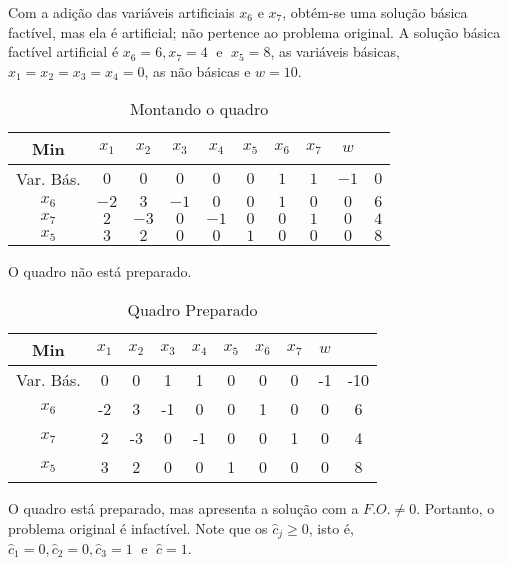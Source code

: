 Com a adição das variáveis artificiais $ x_6 $ e $ x_7 $, obtém-se uma solução
básica factível, mas ela é artificial; não pertence ao problema original.
A solução básica factível artificial é $ x_6 = 6, x_7 = 4 \;\text{ e }\; x_5 = 8 $,
as variáveis básicas, $ x_1 = x_2 = x_3 = x_4 = 0 $, as não básicas e $ w = 10 $.

\newpage

\begin{table}[!htbp]
  \centering
  \caption{Montando o quadro}
  \begin{tabular}{c|cccccccc|c}
    Min       & $x_1$ & $x_2$ & $x_3$ & $x_4$ & $x_5$ & $x_6$ & $x_7$ & $w$ &  \\
    \hline
    Var. Bás. & $0$     & $0$     & $0$     & $0$     & $0$     & $1$     & $1$     & $-1$  & $0$  \\
    \hline
    $x_6$     & $-2$    &  $3$    & $-1$    &  $0$    & $0$     & $1$     & $0$     & $0$   & $6$ \\ 
    $x_7$     &  $2$    & $-3$    &  $0$    & $-1$    & $0$     & $0$     & $1$     & $0$   & $4$ \\
    $x_5$     &  $3$    &  $2$    &  $0$    &  $0$    & $1$     & $0$     & $0$     & $0$   & $8$
  \end{tabular}
\end{table}

O quadro não está preparado.

\begin{table}[!htbp]
  \centering
  \caption{Quadro Preparado}
  \begin{tabular}{c|cccccccc|c}
    Min       & $x_1$ & $x_2$ & $x_3$ & $x_4$ & $x_5$ & $x_6$ & $x_7$ & $w$ &  \\
    \hline
    Var. Bás. & 0     & 0     & 1     & 1     & 0     & 0     & 0     & -1  & -10 \\
    \hline
    $x_6$     & -2    &  3    & -1    &  0    & 0     & 1     & 0     & 0   & 6 \\ 
    $x_7$     & 2     & -3    &  0    & -1    & 0     & 0     & 1     & 0   & 4 \\
    $x_5$     & 3     &  2    &  0    &  0    & 1     & 0     & 0     & 0   & 8
  \end{tabular}
\end{table}

O quadro está preparado, mas apresenta a solução com a $ F.O. \neq 0 $.
Portanto, o problema original é infactível.
Note que os $ \widehat{c}_j \geq 0 $, isto é, $ \widehat{c}_1 = 0, 
\widehat{c}_2 = 0, \widehat{c}_3 = 1 \;\text{ e }\; \widehat{c} = 1$.

